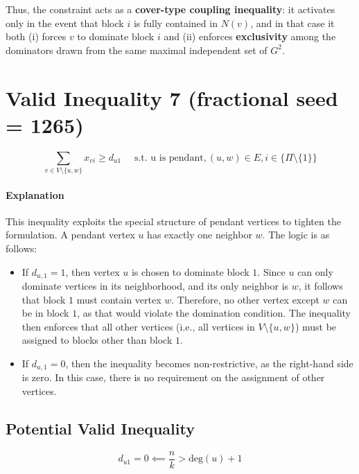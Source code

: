 Thus, the constraint acts as a \textbf{cover-type coupling inequality}: it activates only in the event that block $i$ is fully contained in $N(v)$, and in that case it both (i) forces $v$ to dominate block $i$ and (ii) enforces \textbf{exclusivity} among the dominators drawn from the same maximal independent set of $G^2$.


\section{Valid Inequality 7 (fractional seed = 1265)}  
\begin{equation}
    \sum_{v \in V \setminus \{u,w\}} x_{vi} \geq d_{u1} \quad \text{ s.t. u is pendant}, (u,w) \in E, i \in \{\Pi \setminus \{1\}\}
\end{equation}

\paragraph{Explanation} This inequality exploits the special structure of pendant vertices to tighten the formulation. A pendant vertex $u$ has exactly one neighbor $w$. The logic is as follows:
\begin{itemize}
    \item If $d_{u,1} = 1$, then vertex $u$ is chosen to dominate block $1$. Since $u$ can only dominate vertices in its neighborhood, and its only neighbor is $w$, it follows that block $1$ must contain vertex $w$. Therefore, no other vertex except $w$ can be in block $1$, as that would violate the domination condition. The inequality then enforces that all other vertices (i.e., all vertices in $V \setminus \{u,w\}$) must be assigned to blocks other than block $1$.
    
    \item If $d_{u,1} = 0$, then the inequality becomes non-restrictive, as the right-hand side is zero. In this case, there is no requirement on the assignment of other vertices.
\end{itemize}

\subsection{Potential Valid Inequality}
\begin{equation}
    d_{u1} = 0 \impliedby \frac{n}{k} > \text{deg}(u) + 1
\end{equation}

